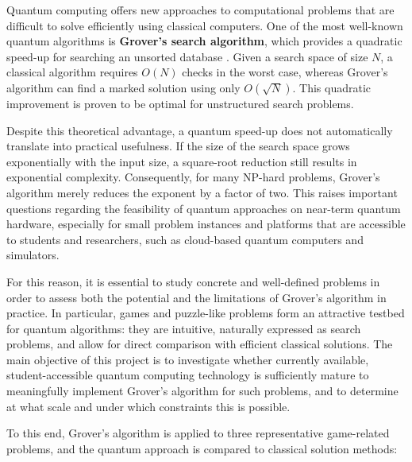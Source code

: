 
Quantum computing offers new approaches to computational problems that are difficult to solve efficiently using classical computers. One of the most well-known quantum algorithms is \textbf{Grover's search algorithm}, which provides a quadratic speed-up for searching an unsorted database \cite{Grover1996}. Given a search space of size \textbf{$N$}, a classical algorithm requires $O(N)$ checks in the worst case, whereas Grover's algorithm can find a marked solution using only $O(\sqrt{N})$. This quadratic improvement is proven to be optimal for unstructured search problems.

\vspace{1em}
\noindent
Despite this theoretical advantage, a quantum speed-up does not automatically translate into practical usefulness. If the size of the search space grows exponentially with the input size, a square-root reduction still results in exponential complexity. Consequently, for many NP-hard problems, Grover’s algorithm merely reduces the exponent by a factor of two. This raises important questions regarding the feasibility of quantum approaches on near-term quantum hardware, especially for small problem instances and platforms that are accessible to students and researchers, such as cloud-based quantum computers and simulators.

\vspace{1em}
\noindent
For this reason, it is essential to study concrete and well-defined problems in order to assess both the potential and the limitations of Grover’s algorithm in practice. In particular, games and puzzle-like problems form an attractive testbed for quantum algorithms: they are intuitive, naturally expressed as search problems, and allow for direct comparison with efficient classical solutions. The main objective of this project is to investigate whether currently available, student-accessible quantum computing technology is sufficiently mature to meaningfully implement Grover’s algorithm for such problems, and to determine at what scale and under which constraints this is possible.

\vspace{1em}
\noindent
To this end, Grover’s algorithm is applied to three representative game-related problems, and the quantum approach is compared to classical solution methods:

